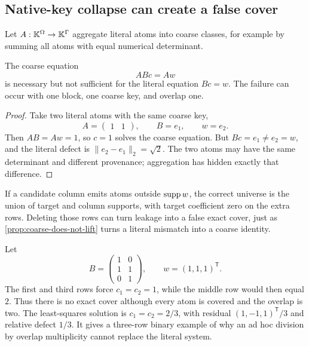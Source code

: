 \subsection{Native-key collapse can create a false cover}

Let \(A:\mathbb K^\Omega\to\mathbb K^\Gamma\) aggregate literal atoms into coarse
classes, for example by summing all atoms with equal numerical
determinant.

\begin{proposition}
\label{prop:coarse-does-not-lift}
The coarse equation
\begin{equation}
 ABc=Aw
 \label{eq:coarse-cover}
\end{equation}
is necessary but not sufficient for the literal equation \(Bc=w\).
The failure can occur with one block, one coarse key, and overlap one.
\end{proposition}

\begin{proof}
Take two literal atoms with the same coarse key,
\[
 A=\begin{pmatrix}1&1\end{pmatrix},
 \qquad
 B=e_1,
 \qquad
 w=e_2.
\]
Then \(AB=Aw=1\), so \(c=1\) solves the coarse equation.  But
\(Bc=e_1\ne e_2=w\), and the literal defect is
\(\|e_2-e_1\|_2=\sqrt2\).  The two atoms may have the same determinant
and different provenance; aggregation has hidden exactly that
difference.
\end{proof}

\begin{remark}
If a candidate column emits atoms outside \(\operatorname{supp} w\), the correct
universe is the union of target and column supports, with target
coefficient zero on the extra rows.  Deleting those rows can turn
leakage into a false exact cover, just as
\cref{prop:coarse-does-not-lift} turns a literal mismatch into a
coarse identity.
\end{remark}

\begin{example}
\label{ex:three-row-overlap}
Let
\[
 B=
 \begin{pmatrix}
 1&0\\
 1&1\\
 0&1
 \end{pmatrix},
 \qquad
 w=(1,1,1)^{\mathsf T}.
\]
The first and third rows force \(c_1=c_2=1\), while the middle row
would then equal \(2\).  Thus there is no exact cover although every
atom is covered and the overlap is two.  The least-squares solution is
\(c_1=c_2=2/3\), with residual
\((1,-1,1)^{\mathsf T}/3\) and relative defect \(1/3\).
It gives a three-row binary example of why an ad hoc division by
overlap multiplicity cannot replace the literal system.
\end{example}
